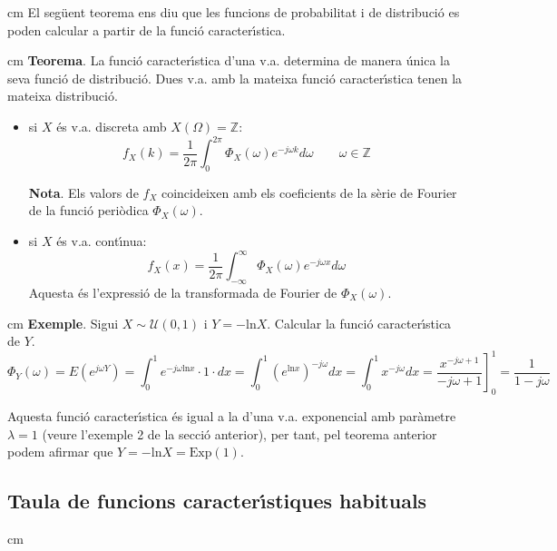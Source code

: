 \documentclass{article}
\def\Z{\mathbb Z}
\begin{document}
 cm
\noindent
El seg\"uent teorema ens diu que les funcions de probabilitat i de distribuci\'o
es poden calcular a partir de la funci\'o caracter\'\i stica.

 cm
\noindent
{\bf Teorema}. La funci\'o caracter\'\i stica d'una v.a. determina de manera \'unica
la seva funci\'o de distribuci\'o. Dues v.a. amb la mateixa funci\'o caracter\'\i stica
tenen la mateixa distribuci\'o. 
\begin{itemize}
\item si $X$ \'es v.a. discreta amb $X(\Omega)=\Z$:
\[
f_X(k)=\frac{1}{2\pi} \int_0^{2\pi} \Phi_X(\omega) e^{-j \omega k} d\omega \qquad \omega \in \Z
\]

{\bf Nota}. Els valors de $f_X$ coincideixen amb els coeficients de la s\`erie de Fourier
de la funci\'o peri\`odica $\Phi_X(\omega)$.

\item si $X$ \'es v.a. cont\'\i nua:
\[
f_X(x)=\frac{1}{2\pi} \int_{-\infty}^{\infty} \Phi_X(\omega) e^{-j \omega x} d\omega
\]
Aquesta \'es l'expressi\'o de la transformada de Fourier de $\Phi_X(\omega)$.
\end{itemize}

 cm
\noindent
{\bf Exemple}. Sigui $X \sim \mathcal{U}(0, 1)$ i $Y=-\mathrm{ln}X$. Calcular la 
funci\'o caracter\'\i stica de $Y$.
\[
\Phi_Y(\omega)=E(e^{j\omega Y})=\int_0^1 e^{-j\omega \mathrm{ln}x} \cdot 1 \cdot dx=
\int_0^1 (e^{\mathrm{ln}x})^{-j \omega} dx= \int_0^1 x^{-j\omega} dx=
\left. \frac{x^{-j\omega + 1}}{-j \omega +1} \right]_0^1=\frac{1}{1-j \omega}
\]

Aquesta funci\'o caracter\'\i stica \'es igual a la d'una v.a. exponencial amb par\`ametre 
$\lambda=1$ (veure l'exemple 2 de la secci\'o anterior), 
per tant, pel teorema anterior podem afirmar que $Y=- \mathrm{ln}X=\mathrm{Exp}(1)$. 

\subsection*{Taula de funcions caracter\'\i stiques habituals}

 cm
\end{document}
